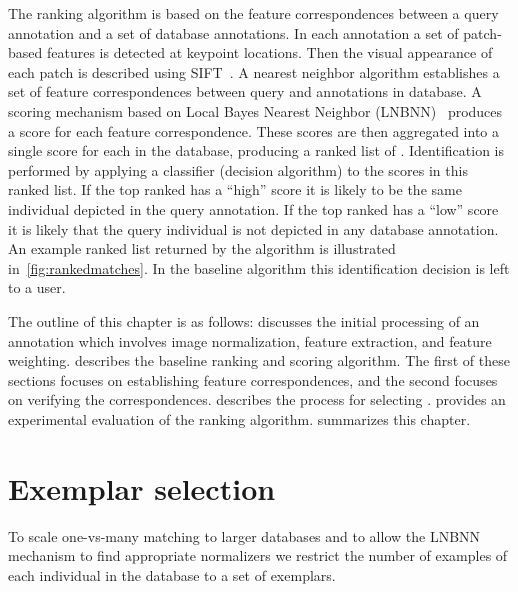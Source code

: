     The ranking algorithm is based on the feature correspondences between a query annotation and a set of database
    annotations. In each annotation a set of patch-based features is detected at keypoint locations. Then the
    visual appearance of each patch is described using SIFT~\cite{lowe_distinctive_2004}. A nearest neighbor
    algorithm establishes a set of feature correspondences between query and annotations in database. A scoring
    mechanism based on Local \Naive{} Bayes Nearest Neighbor (LNBNN)~\cite{mccann_local_2012} produces a score for
    each feature correspondence. These scores are then aggregated into a single score for each \name{} in the
    database, producing a ranked list of \names{}. Identification is performed by applying a classifier (decision
    algorithm) to the scores in this ranked list. If the top ranked \name{} has a ``high'' score it is likely to be
    the same individual depicted in the query annotation. If the top ranked \name{} has a ``low'' score it is
    likely that the query individual is not depicted in any database annotation. An example ranked list returned by
    the algorithm is illustrated in~\cref{fig:rankedmatches}. In the baseline algorithm this identification
    decision is left to a user.

    The outline of this chapter is as follows:  discusses the initial processing of an
    annotation which involves image normalization, feature extraction, and feature weighting.
     describes the baseline ranking and scoring algorithm. The first of these
    sections focuses on establishing feature correspondences, and the second focuses on verifying the
    correspondences.  describes the process for selecting \exemplars{}.
     provides an experimental evaluation of the ranking algorithm.
     summarizes this chapter.

    \rankedmatches{}

%
%
%


\section{Exemplar selection}\label{sec:exempselect}
    To scale one-vs-many matching to larger databases and to allow the LNBNN mechanism to find appropriate
    normalizers we restrict the number of examples of each individual in the database to a set of exemplars.

